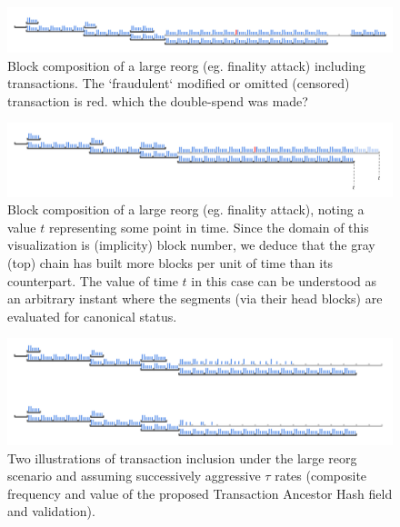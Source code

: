 \documentclass[11pt]{article}
\theoremstyle{plain}
\begin{document}
\begin{figure}[tph]
\centering
\includegraphics[width=1.0\textwidth]{vis_blocksegment_forking_reorg_txs.png}
\caption{Block composition of a large reorg (eg. finality attack) including
transactions.
  The `fraudulent` modified or omitted (censored) transaction is red.
which the double-spend was made?
}
\label{fig:blocksegment_forks_reorg_txs}
\end{figure}

\begin{figure}[tph]
\centering
\includegraphics[width=1.0\textwidth]{vis_blocksegment_forking_reorg_t.png}
\caption{Block composition of a large reorg (eg. finality attack), noting a
value $t$ representing some point in time.
Since the domain of this visualization is (implicity) block number, we deduce
that the gray (top) chain has built more blocks per unit of time than its
counterpart.
The value of time $t$ in this case can be understood as an arbitrary instant
where the segments (via their head blocks) are evaluated for canonical status.
}
\label{fig:blocksegment_forks_reorg__t}
\end{figure}

\begin{figure}[tph]
\centering
\includegraphics[width=1.0\textwidth]{vis_blocksegment_forking_reorg_anchash.png
}
\caption{Two illustrations of transaction inclusion under the large reorg
scenario and assuming successively aggressive $\tau$ rates (composite frequency
and value of the proposed Transaction Ancestor Hash field and validation).
}
\label{fig:blocksegment_forks_reorg_anchash}
\end{figure}
\end{document}
